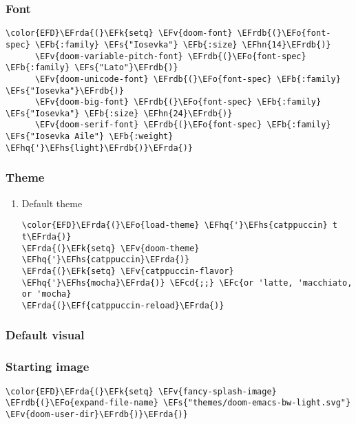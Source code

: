 \documentclass[12pt]{article}
\theoremstyle{plain}%
\theoremstyle{definition}
\theoremstyle{remark}
\newcommand{\EFc}[1]{\textcolor{EFc}{#1}} %
\newcommand{\EFcd}[1]{\textcolor{EFcd}{#1}} %
\newcommand{\EFs}[1]{\textcolor{EFs}{#1}} %
\newcommand{\EFk}[1]{\textcolor{EFk}{#1}} %
\newcommand{\EFb}[1]{\textcolor{EFb}{#1}} %
\newcommand{\EFf}[1]{\textcolor{EFf}{#1}} %
\newcommand{\EFv}[1]{\textcolor{EFv}{#1}} %
\newcommand{\EFo}[1]{\textcolor{EFo}{#1}} %
\newcommand{\EFhn}[1]{\textcolor{EFhn}{\textbf{#1}}} %
\newcommand{\EFhq}[1]{\textcolor{EFhq}{#1}} %
\newcommand{\EFhs}[1]{\textcolor{EFhs}{#1}} %
\newcommand{\EFrda}[1]{\textcolor{EFrda}{#1}} %
\newcommand{\EFrdb}[1]{\textcolor{EFrdb}{#1}} %
\begin{document}
\subsubsection{Font}
\label{sec:orgc6fa1ac}
\begin{Code}
\begin{Verbatim}
\color{EFD}\EFrda{(}\EFk{setq} \EFv{doom-font} \EFrdb{(}\EFo{font-spec} \EFb{:family} \EFs{"Iosevka"} \EFb{:size} \EFhn{14}\EFrdb{)}
      \EFv{doom-variable-pitch-font} \EFrdb{(}\EFo{font-spec} \EFb{:family} \EFs{"Lato"}\EFrdb{)}
      \EFv{doom-unicode-font} \EFrdb{(}\EFo{font-spec} \EFb{:family} \EFs{"Iosevka"}\EFrdb{)}
      \EFv{doom-big-font} \EFrdb{(}\EFo{font-spec} \EFb{:family} \EFs{"Iosevka"} \EFb{:size} \EFhn{24}\EFrdb{)}
      \EFv{doom-serif-font} \EFrdb{(}\EFo{font-spec} \EFb{:family} \EFs{"Iosevka Aile"} \EFb{:weight} \EFhq{'}\EFhs{light}\EFrdb{)}\EFrda{)}
\end{Verbatim}
\end{Code}
\subsubsection{Theme}
\label{sec:org398df39}
\begin{enumerate}
\item Default theme
\label{sec:org907089b}
\begin{Code}
\begin{Verbatim}
\color{EFD}\EFrda{(}\EFo{load-theme} \EFhq{'}\EFhs{catppuccin} t t\EFrda{)}
\EFrda{(}\EFk{setq} \EFv{doom-theme} \EFhq{'}\EFhs{catppuccin}\EFrda{)}
\EFrda{(}\EFk{setq} \EFv{catppuccin-flavor} \EFhq{'}\EFhs{mocha}\EFrda{)} \EFcd{;;} \EFc{or 'latte, 'macchiato, or 'mocha}
\EFrda{(}\EFf{catppuccin-reload}\EFrda{)}
\end{Verbatim}
\end{Code}
\end{enumerate}
\subsubsection{Default visual}
\label{sec:orgeb2fe83}
\subsubsection{Starting image}
\label{sec:org16fb904}
\begin{Code}
\begin{Verbatim}
\color{EFD}\EFrda{(}\EFk{setq} \EFv{fancy-splash-image} \EFrdb{(}\EFo{expand-file-name} \EFs{"themes/doom-emacs-bw-light.svg"} \EFv{doom-user-dir}\EFrdb{)}\EFrda{)}
\end{Verbatim}
\end{Code}
\end{document}
